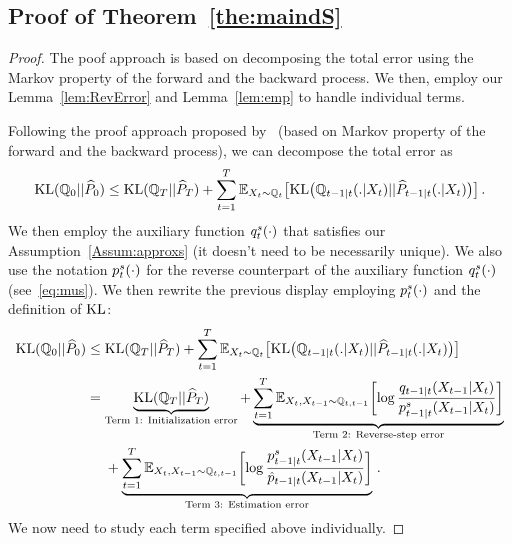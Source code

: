 \subsection{Proof of Theorem~\ref{the:maindS}}\label{proof:mainR}
\begin{proof}

The poof approach is based on decomposing the total error using the Markov property of the forward and the backward process. 
We then, employ our Lemma~\ref{lem:RevError} and Lemma~\ref{lem:emp} to handle individual terms. 


Following the proof approach proposed by~\citet[Equation~13]{liang2024nonN} (based on Markov property of the forward and the backward process), we can decompose the total  error as  
\begin{equation*}
    \operatorname{KL}(\mathbb{Q}_0 ||\widehat{P}_0) \le \operatorname{KL}(\mathbb{Q}_T||\widehat{P}_T)+\sum_{t=1}^{T} \textcolor{black}{\mathbb{E}}_{X_t\sim \mathbb{Q}_t}\bigl[\operatorname{KL}\bigl(\mathbb{Q}_{t-1|t}(.|X_t)||\widehat{P}_{t-1|t}(.|X_t)\bigr)\bigr]\,.
\end{equation*}
We then employ the auxiliary function $q^s_t(\cdot)$ that  satisfies our Assumption~\ref{Assum:approxs} (it doesn't need to be necessarily unique). 
We also use the notation $p^s_t(\cdot)$ for the  reverse counterpart  of the auxiliary function $q^s_t(\cdot)$ (see~\eqref{eq:mus}).
 We then  rewrite the previous display employing $p^s_t(\cdot)$ and the definition of $\operatorname{KL}$:
\begin{align*}
    \operatorname{KL}(\mathbb{Q}_0 ||\widehat{P}_0) &\le \operatorname{KL}(\mathbb{Q}_T||\widehat{P}_T)+\sum_{t=1}^{T} \textcolor{black}{\mathbb{E}}_{X_t\sim \mathbb{Q}_t}\bigl[\operatorname{KL}\bigl(\mathbb{Q}_{t-1|t}(.|X_t)||\widehat{P}_{t-1|t}(.|X_t)\bigr)\bigr]\\
&=\underbrace{\operatorname{KL}(\mathbb{Q}_T||\widehat{P}_T)}_{\text{Term~1: Initialization error}}
+\underbrace{\sum_{t=1}^{T} \textcolor{black}{\mathbb{E}}_{X_t,X_{t-1}\sim \mathbb{Q}_{t,t-1}}\biggl[\log\frac{q_{t-1|t}(X_{t-1}|X_t)}{p^s_{t-1|t}(X_{t-1}|X_t)}\biggr]}_{\text{Term~2: Reverse-step error}}\\
&~~~~+\underbrace{\sum_{t=1}^{T} \textcolor{black}{\mathbb{E}}_{X_t,X_{t-1}\sim \mathbb{Q}_{t,t-1}}\biggl[\log\frac{p^s_{t-1|t}(X_{t-1}|X_t)}{\hat{p}_{t-1|t}(X_{t-1}|X_t)}\biggr]}_{\text{Term~3: Estimation error}}\,.
\end{align*}
We now need to study each term specified above individually. 



\end{proof}
